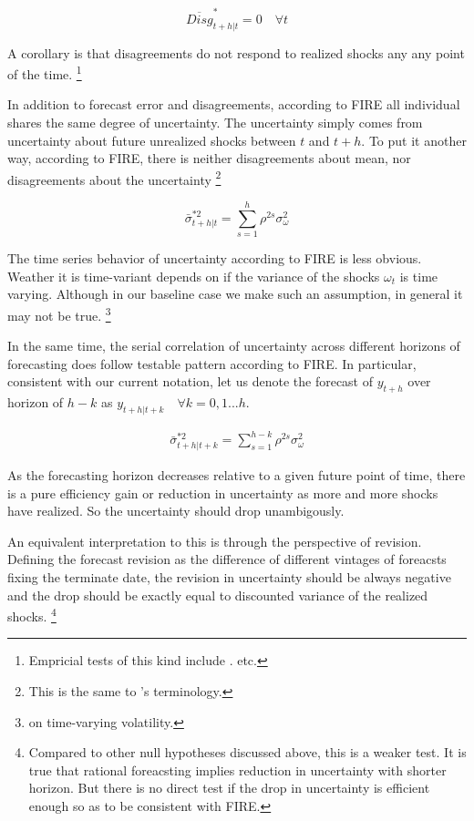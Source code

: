 \documentclass[]{article}
\begin{document}
$$\overline{Disg}^{*}_{t+h|t}=0 \quad \forall t$$

A corollary is that disagreements do not respond to realized shocks any any point of the time.  \footnote{Empricial tests of this kind include \citet{xx}.\citet{xx} etc. }

In addition to forecast error and disagreements, according to FIRE all individual shares the same degree of uncertainty. The uncertainty simply comes from uncertainty about future unrealized shocks between $t$ and $t+h$. To put it another way, according to FIRE, there is neither disagreements about mean, nor disagreements about the uncertainty \footnote{This is the same to \citet{}'s terminology.} 

$$\bar \sigma^{*2}_{t+h|t} = \sum^{h}_{s=1}\rho^{2s} \sigma^2_{\omega}$$

The time series behavior of uncertainty according to FIRE is less obvious. Weather it is time-variant depends on if the variance of the shocks $\omega_t$ is time varying. Although in our baseline case we make such an assumption, in general it may not be true. \footnote{\citet{xx} on time-varying volatility.}

In the same time, the serial correlation of uncertainty across different horizons of forecasting does follow testable pattern according to FIRE. In particular, consistent with our current notation, let us denote the forecast of $y_{t+h}$ over horizon of $h-k$ as $y_{t+h|t+k} \quad \forall k =0,1...h$. 

\begin{eqnarray}\label{VarREPop}
\bar \sigma^{*2}_{t+h|t+k} = \sum^{h-k}_{s=1}\rho^{2s} \sigma^2_{\omega}
\end{eqnarray}

As the forecasting horizon decreases relative to a given future point of time, there is a pure efficiency gain or reduction in uncertainty as more and more shocks have realized. So the uncertainty should drop unambigously. 

An equivalent interpretation to this is through the perspective of revision. Defining the forecast revision as the difference of different vintages of foreacsts fixing the terminate date, the revision in uncertainty should be always negative and the drop should be exactly equal to discounted variance of the realized shocks. \footnote{Compared to other null hypotheses discussed above, this is a weaker test. It is true that rational foreacsting implies reduction in uncertainty with shorter horizon. But there is no direct test if the drop in uncertainty is efficient enough so as to be consistent with FIRE. }
\end{document}
